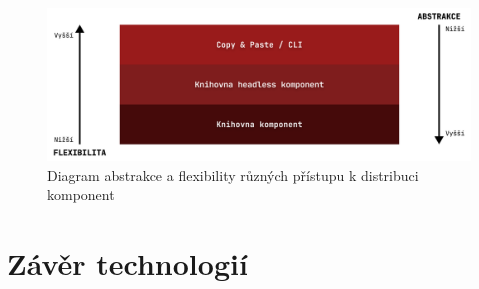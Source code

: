 \begin{figure}[h]
      \centering
      \includegraphics[width=\textwidth]{./assets/figures/component-lib-distribution-comparison.png}
      \captionsetup{justification=centering}
      \caption{Diagram abstrakce a flexibility různých přístupu k distribuci komponent}
\end{figure}

\section{Závěr technologií}

